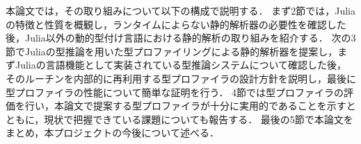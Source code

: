 本論文では，その取り組みについて以下の構成で説明する．
まず2節では，Juliaの特徴と性質を概観し，ランタイムによらない静的解析器の必要性を確認した後，Julia以外の動的型付け言語における静的解析の取り組みを紹介する．
次の3節でJuliaの型推論を用いた型プロファイリングによる静的解析器を提案し，まずJuliaの言語機能として実装されている型推論システムについて確認した後，そのルーチンを内部的に再利用する型プロファイラの設計方針を説明し，最後に型プロファイラの性能について簡単な証明を行う． %
4節では型プロファイラの評価を行い，本論文で提案する型プロファイラが十分に実用的であることを示すとともに，現状で把握できている課題についても報告する．
最後の5節で本論文をまとめ，本プロジェクトの今後について述べる．
